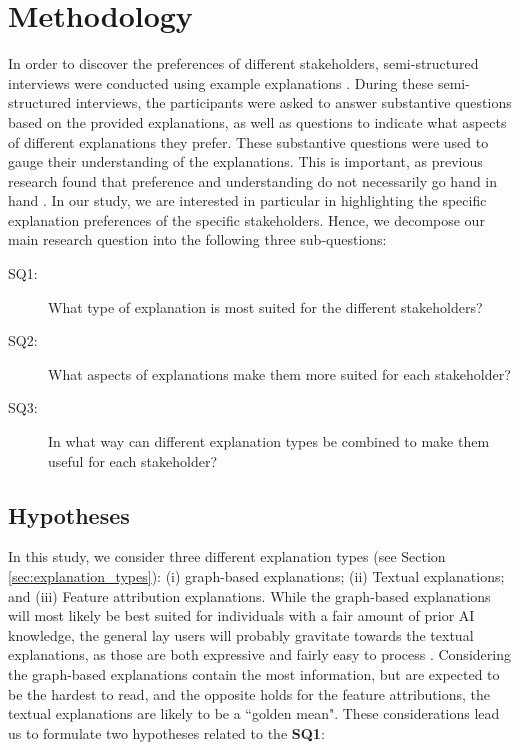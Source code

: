 \section{Methodology}

In order to discover the preferences of different stakeholders, semi-structured interviews were conducted using example explanations \cite{garcia2018mixed}. During these semi-structured interviews, the participants were asked to answer substantive questions based on the provided explanations, as well as questions to indicate what aspects of different explanations they prefer. These substantive questions were used to gauge their understanding of the explanations. This is important, as previous research found that preference and understanding do not necessarily go hand in hand \cite{szymanski2021visual}. In our study, we are interested in particular in highlighting the specific explanation preferences of the specific stakeholders. Hence, we decompose our main research question into the following three sub-questions:

\begin{description}
    \item[SQ1:] What type of explanation is most suited for the different stakeholders?
    \item[SQ2:] What aspects of explanations make them more suited for each stakeholder?
    \item[SQ3:] In what way can different explanation types be combined to make them useful for each stakeholder?
\end{description}


\subsection{Hypotheses}

In this study, we consider three different explanation types (see Section \ref{sec:explanation_types}): (i) graph-based explanations; (ii) Textual explanations; and (iii) Feature attribution explanations. While the graph-based explanations will most likely be best suited for individuals with a fair amount of prior AI knowledge, the general lay users will probably gravitate towards the textual explanations, as those are both expressive and fairly easy to process \cite{purificato2021evaluating}. Considering the graph-based explanations contain the most information, but are expected to be the hardest to read, and the opposite holds for the feature attributions, the textual explanations are likely to be a ``golden mean". These considerations lead us to formulate two hypotheses related to the \textbf{SQ1}:

